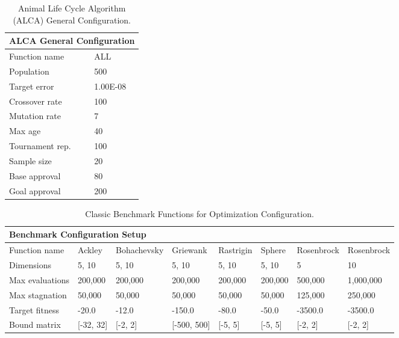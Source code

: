 \documentclass[graybox]{svmult}
\begin{document}
        \begin{table}[]
            \scriptsize
            \centering
            \caption{Animal Life Cycle Algorithm (ALCA) General Configuration.}\label{tab.general_configuration}
            \begin{tabular}{@{}ll@{}}
            \toprule
            \multicolumn{2}{l}{\textbf{ALCA General Configuration}} \\ \midrule
            Function name & ALL \\
            Population & 500 \\
            Target error & 1.00E-08 \\
            Crossover rate & 100 \\
            Mutation rate & 7 \\
            Max age & 40 \\
            Tournament rep. & 100 \\
            Sample size & 20 \\
            Base approval & 80 \\
            Goal approval & 200 \\ \bottomrule
            \end{tabular}
            \end{table}

        \begin{table}[]
            \scriptsize
            \centering
            \caption{Classic Benchmark Functions for Optimization Configuration.}\label{tab.benchmark_fun_config}
            \begin{tabular}{@{}llllllll@{}}
            \toprule
            \multicolumn{8}{l}{\textbf{Benchmark Configuration Setup}} \\ \midrule
            Function name & Ackley & Bohachevsky & Griewank & Rastrigin & Sphere & Rosenbrock & Rosenbrock \\
            Dimensions & 5, 10 & 5, 10 & 5, 10 & 5, 10 & 5, 10 & 5 & 10 \\
            Max evaluations & 200,000 & 200,000 & 200,000 & 200,000 & 200,000 & 500,000 & 1,000,000 \\
            Max stagnation & 50,000 & 50,000 & 50,000 & 50,000 & 50,000 & 125,000 & 250,000 \\
            Target fitness & -20.0 & -12.0 & -150.0 & -80.0 & -50.0 & -3500.0 & -3500.0 \\
            Bound matrix & {[}-32, 32{]} & {[}-2, 2{]} & {[}-500, 500{]} & {[}-5, 5{]} & {[}-5, 5{]} & {[}-2, 2{]} & {[}-2, 2{]} \\ \bottomrule
            \end{tabular}
            \end{table}
        
\end{document}
